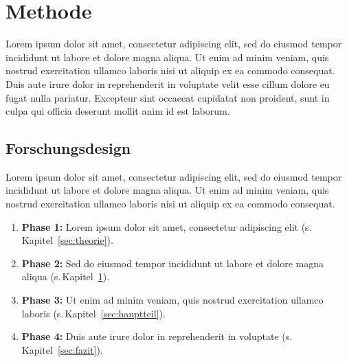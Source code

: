 
\section{Methode}
\label{sec:methode}

Lorem ipsum dolor sit amet, consectetur adipiscing elit, sed do eiusmod tempor
incididunt ut labore et dolore magna aliqua. Ut enim ad minim veniam, quis
nostrud exercitation ullamco laboris nisi ut aliquip ex ea commodo consequat.\autocite[Vgl.][S.
42]{muster:buch:2023} Duis aute irure dolor in reprehenderit in voluptate velit esse
cillum dolore eu fugat nulla pariatur. Excepteur sint occaecat cupidatat non
proident, sunt in culpa qui officia deserunt mollit anim id est laborum.

\subsection{Forschungsdesign}
\label{sec:forschungsdesign}

Lorem ipsum dolor sit amet, consectetur adipiscing elit, sed do eiusmod tempor
incididunt ut labore et dolore magna aliqua. Ut enim ad minim veniam, quis
nostrud exercitation ullamco laboris nisi ut aliquip ex ea commodo consequat.

\begin{enumerate}
	\item \textbf{Phase 1:} Lorem ipsum dolor sit amet, consectetur adipiscing elit
		(s.\,Kapitel~\ref{sec:theorie}).

	\item \textbf{Phase 2:} Sed do eiusmod tempor incididunt ut labore et dolore
		magna aliqua (s.\,Kapitel~\ref{sec:methode}).

	\item \textbf{Phase 3:} Ut enim ad minim veniam, quis nostrud exercitation ullamco
		laboris (s.\,Kapitel~\ref{sec:hauptteil}).

	\item \textbf{Phase 4:} Duis aute irure dolor in reprehenderit in voluptate (s.\,Kapitel~\ref{sec:fazit}).
\end{enumerate}

\clearpage


